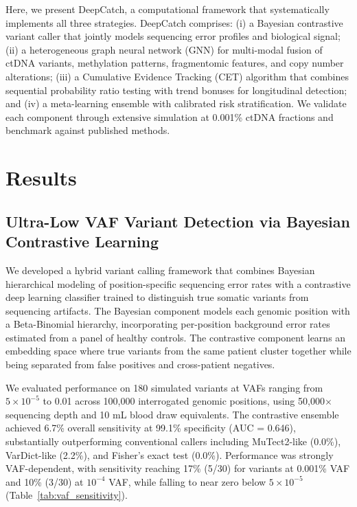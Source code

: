 \documentclass[10pt,a4paper]{article}
\begin{document}
Here, we present DeepCatch, a computational framework that systematically implements all three strategies. DeepCatch comprises: (i) a Bayesian contrastive variant caller that jointly models sequencing error profiles and biological signal; (ii) a heterogeneous graph neural network (GNN) for multi-modal fusion of ctDNA variants, methylation patterns, fragmentomic features, and copy number alterations; (iii) a Cumulative Evidence Tracking (CET) algorithm that combines sequential probability ratio testing with trend bonuses for longitudinal detection; and (iv) a meta-learning ensemble with calibrated risk stratification. We validate each component through extensive simulation at 0.001\% ctDNA fractions and benchmark against published methods.


\section{Results}

\subsection{Ultra-Low VAF Variant Detection via Bayesian Contrastive Learning}

We developed a hybrid variant calling framework that combines Bayesian hierarchical modeling of position-specific sequencing error rates with a contrastive deep learning classifier trained to distinguish true somatic variants from sequencing artifacts. The Bayesian component models each genomic position with a Beta-Binomial hierarchy, incorporating per-position background error rates estimated from a panel of healthy controls. The contrastive component learns an embedding space where true variants from the same patient cluster together while being separated from false positives and cross-patient negatives.

We evaluated performance on 180 simulated variants at VAFs ranging from $5 \times 10^{-5}$ to 0.01 across 100,000 interrogated genomic positions, using 50,000$\times$ sequencing depth and 10 mL blood draw equivalents. The contrastive ensemble achieved 6.7\% overall sensitivity at 99.1\% specificity (AUC = 0.646), substantially outperforming conventional callers including MuTect2-like (0.0\%), VarDict-like (2.2\%), and Fisher's exact test (0.0\%). Performance was strongly VAF-dependent, with sensitivity reaching 17\% (5/30) for variants at 0.001\% VAF and 10\% (3/30) at $10^{-4}$ VAF, while falling to near zero below $5 \times 10^{-5}$ (Table~\ref{tab:vaf_sensitivity}).
\end{document}
